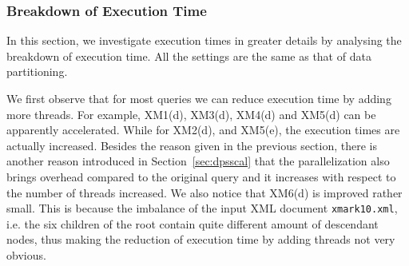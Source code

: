 \subsubsection{Breakdown of Execution Time}

In this section, we investigate execution times in greater details by analysing
the breakdown of execution time. All the settings are the same as that of data
partitioning.

We first observe that for most queries we can reduce execution time by adding
more threads. For example, XM1(d), XM3(d), XM4(d) and XM5(d) can be apparently
accelerated. While for XM2(d), and XM5(e), the execution times are actually
increased. Besides the reason given in the previous section, there is another
reason introduced in Section~\ref{sec:dpsscal} that the parallelization also
brings overhead compared to the original query and it increases with respect to
the number of threads increased. We also notice that XM6(d) is improved rather
small. This is because the imbalance of the input XML document
\texttt{xmark10.xml},  i.e. the six children of the root contain quite different
amount of descendant nodes,  thus making the reduction of execution time by
adding threads not very obvious.
